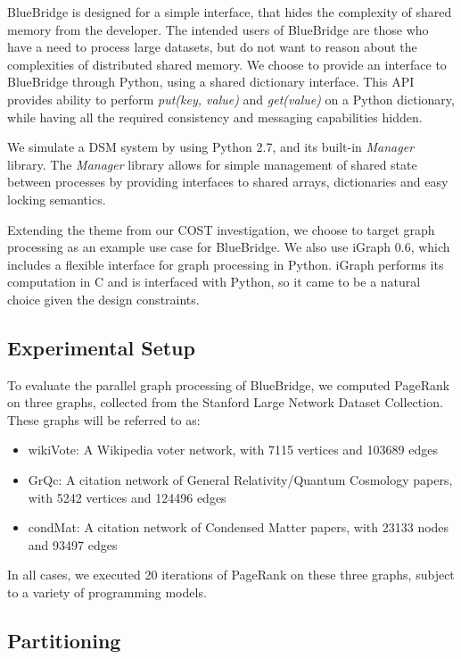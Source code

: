 BlueBridge is designed for a simple interface, that hides the complexity of
shared memory from the developer. The intended users of BlueBridge are those who
have a need to process large datasets, but do not want to reason about the
complexities of distributed shared memory. We choose to provide an interface
to BlueBridge through Python, using a shared dictionary interface. This API
provides ability to perform \textit{put(key, value)} and \textit{get(value)}
on a Python dictionary, while having all the required consistency and messaging
capabilities hidden.

We simulate a DSM system by using Python 2.7, and its built-in \textit{Manager}
library. The \textit{Manager} library allows for simple management of shared
state between processes by providing interfaces to shared arrays, dictionaries
and easy locking semantics. 

Extending the theme from our COST investigation, we choose to target graph
processing as an example use case for BlueBridge. We also use iGraph 0.6, which
includes a flexible interface for graph processing in Python. iGraph performs
its computation in C and is interfaced with Python, so it came to be a natural 
choice given the design constraints.

\subsection{Experimental Setup}

To evaluate the parallel graph processing of BlueBridge, we computed PageRank
on three graphs, collected from the Stanford Large Network Dataset Collection.
~\cite{snapnets} These graphs will be referred to as:

\begin{itemize}
	\item wikiVote: A Wikipedia voter network, with 7115 vertices and 103689 edges
	\item GrQc: A citation network of General Relativity/Quantum Cosmology papers,
	 with 5242 vertices and 124496 edges
	\item condMat: A citation network of Condensed Matter papers, with 23133 nodes
	 and 93497 edges
\end{itemize}

In all cases, we executed 20 iterations of PageRank on these three graphs, subject
to a variety of programming models.

\subsection{Partitioning}

